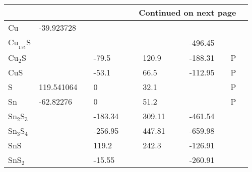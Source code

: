 \begin{landscape}
\begin{center}
\begin{longtable}{|l|p{2.5cm}|l|p{2.5cm}|l|l|p{2.5cm}|l|l|p{2.5cm}|l|l|l|}
\hline \multicolumn{12}{|r|}{{Continued on next page}} \\ \hline
\endfoot

\hline
\endlastfoot


Cu                          & -39.923728 & \citep{Barin1977} &         &  &                                                &        &  &                                                &         &  &                      \\
Cu$_{_1.85}$S               &            &                     &         &  &                                                &        &  &                                                & -496.45 &  & \citep{Hiroi1986}  \\
Cu$_2$S                     &            &                     & -79.5   &  & \citep{Haynes2013}                           & 120.9  &  & \citep{Haynes2013}                           & -188.31 &  & P                    \\
CuS                         &            &                     & -53.1   &  & \citep{Haynes2013}                           & 66.5   &  & \citep{Haynes2013}                           & -112.95 &  & P                    \\
S                           & 119.541064 & \citep{Barin1977} & 0       &  & \citep{Barin1977}                            & 32.1   &  & \citep{Haynes2013}                           &         &  & P                    \\
Sn                          & -62.82276  & \citep{Barin1977} & 0       &  & \citep{Barin1977}                            & 51.2   &  & \citep{Haynes2013}                           &         &  & P                    \\
Sn$_2$S$_3$                 &            &                     & -183.34 &  & \citep{Barin1977}                            & 309.11 &  & \citep{Barin1977}                            & -461.54 &  & \citep{Barin1977}  \\
Sn$_3$S$_4$                 &            &                     & -256.95 &  & \citep{Barin1977}                            & 447.81 &  & \citep{Barin1977}                            & -659.98 &  & \citep{Barin1977}  \\
SnS                         &            &                     & 119.2   &  & \citep{WagmanDonaldD1969}                    & 242.3  &  & \citep{Hellwege1984}                         & -126.91 &  & \citep{Barin1977}  \\
SnS$_2$                     &            &                     & -15.55  &  &                                                &        &  &                                                & -260.91 &  & \citep{Barin1977}  \\

\end{longtable}
\end{center}
\end{landscape}
